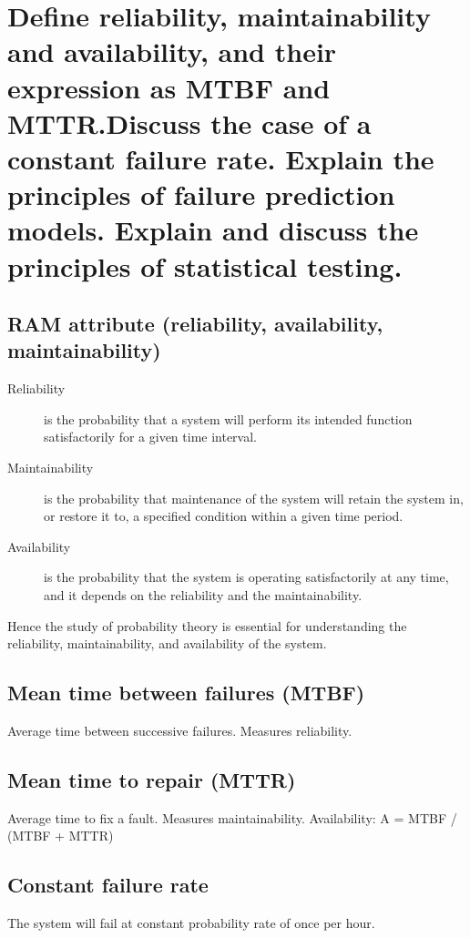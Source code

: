 \clearpage{}
\section{Define reliability, maintainability and availability, and their
expression as MTBF and MTTR.\@ Discuss the case of a constant failure rate.
Explain the principles of failure prediction models. Explain and discuss
the principles of statistical testing.}


\subsection{RAM attribute (reliability, availability, maintainability)}

\begin{description}
    \item[Reliability] is the probability that a system will perform its intended function satisfactorily for a given time interval.
    \item[Maintainability] is the probability that maintenance of the system will retain the system in, or restore it to, a specified condition within a given time period.
    \item[Availability] is the probability that the system is operating satisfactorily at any time, and it depends on the reliability and the maintainability.
\end{description}

Hence the study of probability theory is essential for understanding the reliability, maintainability, and availability of the system.

\subsection{Mean time between failures (MTBF)}
Average time between successive failures. Measures reliability.

\subsection{Mean time to repair (MTTR)}
Average time to fix a fault. Measures maintainability. \newline
Availability: A = MTBF / (MTBF + MTTR)

\subsection{Constant failure rate}
The system will fail at constant probability rate of once per hour. \newline

